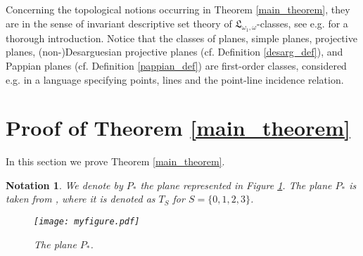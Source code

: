 \documentclass{amsart}
\newtheorem{notation}[theorem]{Notation}
\numberwithin{claimcounter}{theorem}
\begin{document}
	Concerning the topological notions occurring in Theorem \ref{main_theorem}, they are in the sense of invariant descriptive set theory of $\mathfrak{L}_{\omega_1, \omega}$-classes, see e.g. \cite[Chapter 11]{gao_invariant} for a thorough introduction.  Notice that the classes of planes, simple planes, projective planes, (non-)Desarguesian projective planes (cf. Definition \ref{desarg_def}), and Pappian planes (cf. Definition \ref{pappian_def}) are first-order classes, considered e.g. in a language specifying points, lines and the point-line incidence relation. 

\section{Proof of Theorem \ref{main_theorem}}

	In this section we prove Theorem \ref{main_theorem}.


\begin{notation}\label{notation_Bonin_paper} We denote by $P_*$ the plane represented in Figure \ref{figure1}. The plane $P_*$ is taken from \cite{bonin}, where it is denoted as $T_S$ for $S = \{ 0, 1, 2, 3 \}$.
\begin{figure}[htb]
\begin{center}
\texttt{[image: myfigure.pdf]}\caption{The plane $P_*$.}\label{figure1}
\end{center}
\end{figure}
\end{notation}
		
\end{document}
